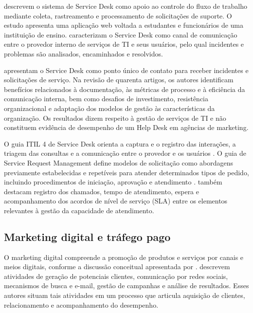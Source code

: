  descrevem o sistema de Service Desk como apoio ao controle do fluxo de trabalho mediante coleta, rastreamento e processamento de solicitações de suporte. O estudo apresenta uma aplicação web voltada a estudantes e funcionários de uma instituição de ensino.  caracterizam o Service Desk como canal de comunicação entre o provedor interno de serviços de TI e seus usuários, pelo qual incidentes e problemas são analisados, encaminhados e resolvidos.

 apresentam o Service Desk como ponto único de contato para receber incidentes e solicitações de serviço. Na revisão de quarenta artigos, os autores identificam benefícios relacionados à documentação, às métricas de processo e à eficiência da comunicação interna, bem como desafios de investimento, resistência organizacional e adaptação dos modelos de gestão às características da organização. Os resultados dizem respeito à gestão de serviços de TI e não constituem evidência de desempenho de um Help Desk em agências de marketing.

O guia ITIL 4 de Service Desk orienta a captura e o registro das interações, a triagem das consultas e a comunicação entre o provedor e os usuários \cite{servicedesk2023}. O guia de Service Request Management define modelos de solicitação como abordagens previamente estabelecidas e repetíveis para atender determinados tipos de pedido, incluindo procedimentos de iniciação, aprovação e atendimento \cite{servicerequest2020}.  também destacam registro dos chamados, tempo de atendimento, espera e acompanhamento dos acordos de nível de serviço (SLA) entre os elementos relevantes à gestão da capacidade de atendimento.

\subsection{\esp Marketing digital e tráfego pago}

O marketing digital compreende a promoção de produtos e serviços por canais e meios digitais, conforme a discussão conceitual apresentada por .  descrevem atividades de geração de potenciais clientes, comunicação por redes sociais, mecanismos de busca e e-mail, gestão de campanhas e análise de resultados. Esses autores situam tais atividades em um processo que articula aquisição de clientes, relacionamento e acompanhamento do desempenho.

